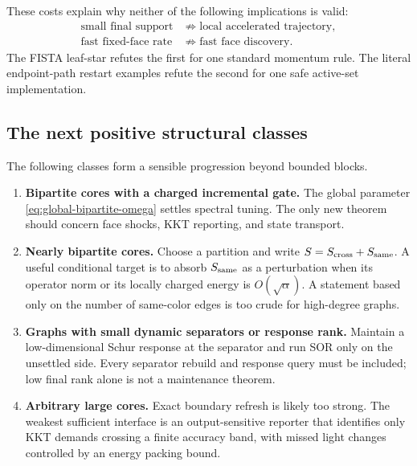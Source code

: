 These costs explain why neither of the following implications is valid:
\begin{equation}
 \begin{aligned}
 \text{small final support}
 &\not\Longrightarrow
 \text{local accelerated trajectory},\\
 \text{fast fixed-face rate}
 &\not\Longrightarrow
 \text{fast face discovery}.
 \end{aligned}
 \label{eq:two-invalid-implications}
\end{equation}
The FISTA leaf-star refutes the first for one standard momentum rule.  The
literal endpoint-path restart examples refute the second for one safe
active-set implementation.

\subsection{The next positive structural classes}

The following classes form a sensible progression beyond bounded blocks.

\begin{enumerate}[leftmargin=*]
\item \textbf{Bipartite cores with a charged incremental gate.}  The global
      parameter \eqref{eq:global-bipartite-omega} settles spectral tuning.
      The only new theorem should concern face shocks, KKT reporting, and
      state transport.
\item \textbf{Nearly bipartite cores.}  Choose a partition and write
      $S=S_{\rm cross}+S_{\rm same}$.  A useful conditional target is to
      absorb $S_{\rm same}$ as a perturbation when its operator norm or its
      locally charged energy is $O(\sqrt\alpha)$.  A statement based only on
      the number of same-color edges is too crude for high-degree graphs.
\item \textbf{Graphs with small dynamic separators or response rank.}
      Maintain a low-dimensional Schur response at the separator and run SOR
      only on the unsettled side.  Every separator rebuild and response query
      must be included; low final rank alone is not a maintenance theorem.
\item \textbf{Arbitrary large cores.}  Exact boundary refresh is likely too
      strong.  The weakest sufficient interface is an output-sensitive
      reporter that identifies only KKT demands crossing a finite accuracy
      band, with missed light changes controlled by an energy packing bound.
\end{enumerate}

